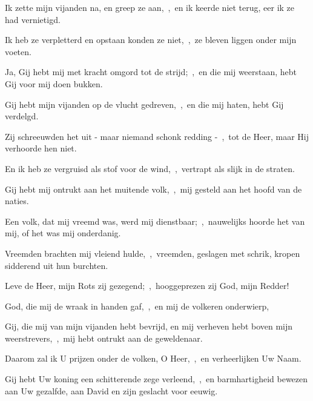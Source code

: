 \documentclass[12pt,twoside,a5paper]{article}
\begin{document}
\begin{halfparskip}
  Ik zette mijn vijanden na, en greep ze aan,~\sep\ en ik keerde niet terug, eer ik ze had vernietigd.

  Ik heb ze verpletterd en opstaan konden ze niet,~\sep\ ze bleven liggen onder mijn voeten.

  Ja, Gij hebt mij met kracht omgord tot de strijd;~\sep\ en die mij weerstaan, hebt Gij voor mij doen bukken.

  Gij hebt mijn vijanden op de vlucht gedreven,~\sep\ en die mij haten, hebt Gij verdelgd.

  Zij schreeuwden het uit - maar niemand schonk redding -~\sep\ tot de Heer, maar Hij verhoorde hen niet.

  En ik heb ze vergruisd als stof voor de wind,~\sep\ vertrapt als slijk in de straten.

  Gij hebt mij ontrukt aan het muitende volk,~\sep\ mij gesteld aan het hoofd van de naties.

  Een volk, dat mij vreemd was, werd mij dienstbaar;~\sep\ nauwelijks hoorde het van mij, of het was mij onderdanig.

  Vreemden brachten mij vleiend hulde,~\sep\ vreemden, geslagen met schrik, kropen sidderend uit hun burchten.

  Leve de Heer, mijn Rots zij gezegend;~\sep\ hooggeprezen zij God, mijn Redder!

  God, die mij de wraak in handen gaf,~\sep\ en mij de volkeren onderwierp,

  Gij, die mij van mijn vijanden hebt bevrijd, en mij verheven hebt boven mijn weerstrevers,~\sep\ mij hebt ontrukt aan de geweldenaar.

  Daarom zal ik U prijzen onder de volken, O Heer,~\sep\ en verheerlijken Uw Naam.

  Gij hebt Uw koning een schitterende zege verleend,~\sep\ en barmhartigheid bewezen aan Uw gezalfde, aan David en zijn geslacht voor eeuwig.
\end{halfparskip}

\end{document}
